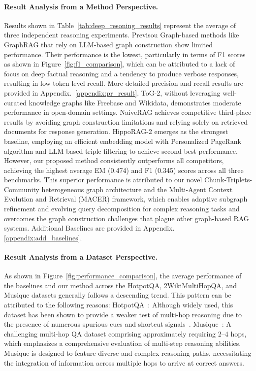 \paragraph{Result Analysis from a Method Perspective.} Results shown in Table~\ref{tab:deep_resoning_results} represent the average of three independent reasoning experiments.
Previsou Graph-based methods like GraphRAG that rely on LLM-based graph construction show limited performance. Their performance is the lowest, particularly in terms of F1 scores as shown in Figure~\ref{fig:f1_comparison}, which can be attributed to a lack of focus on deep factual reasoning and a tendency to produce verbose responses, resulting in low token-level recall. 
More detailed precision and recall results are provided in Appendix.~\ref{appendix:pr_result}. 
ToG-2, without leveraging well-curated knowledge graphs like Freebase and Wikidata, demonstrates moderate performance in open-domain settings. 
NaiveRAG achieves competitive third-place results by avoiding graph construction limitations and relying solely on retrieved documents for response generation.
HippoRAG-2 emerges as the strongest baseline, employing an efficient embedding model with Personalized PageRank algorithm and LLM-based triple filtering to achieve second-best performance. 
However, our proposed method consistently outperforms all competitors, achieving the highest average EM (0.474) and F1 (0.345) scores across all three benchmarks. This superior performance is attributed to our novel Chunk-Triplets-Community heterogeneous graph architecture and the Multi-Agent Context Evolution and Retrieval (MACER) framework, which enables adaptive subgraph refinement and evolving query decomposition for complex reasoning tasks and overcomes the graph construction challenges that plague other graph-based RAG systems. 
Additional Baselines are provided in Appendix.\ref{appendix:add_baselines}.

\paragraph{Result Analysis from a Dataset Perspective.} As shown in Figure~\ref{fig:performance_comparison}, the average performance of the baselines and our method across the HotpotQA, 2WikiMultiHopQA, and Musique datasets generally follows a descending trend. This pattern can be attributed to the following reasons: HotpotQA~\citep{yang2018hotpotqa}: Although widely used, this dataset has been shown to provide a weaker test of multi-hop reasoning due to the presence of numerous spurious cues and shortcut signals~\citep{musique,hipporag}. Musique~\citep{musique}: A challenging multi-hop QA dataset comprising approximately requiring 2–4 hops, which emphasizes a comprehensive evaluation of multi-step reasoning abilities. Musique is designed to feature diverse and complex reasoning paths, necessitating the integration of information across multiple hops to arrive at correct answers. 

